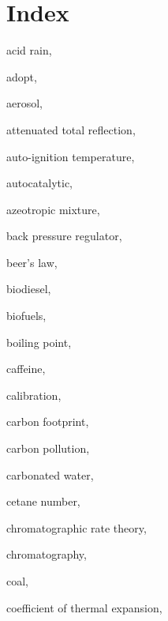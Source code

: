 
\chapter{Index} %

\label{AppendixA} %


\begin{theindex}

  \item \lowercase {acid rain}, 
  \item \lowercase {adopt}, 
  \item \lowercase {aerosol}, 
  \item \lowercase {attenuated total reflection}, 
  \item \lowercase {auto-ignition temperature}, 
  \item \lowercase {autocatalytic}, 
  \item \lowercase {azeotropic mixture}, 
  \item \lowercase {back pressure regulator}, 
  \item \lowercase {Beer's law}, 
  \item \lowercase {biodiesel}, 
  \item \lowercase {biofuels}, 
  \item \lowercase {boiling point}, 
  \item \lowercase {caffeine}, 
  \item \lowercase {calibration}, 
  \item \lowercase {carbon footprint}, 
  \item \lowercase {carbon pollution}, 
  \item \lowercase {carbonated water}, 
  \item \lowercase {cetane number}, 
  \item \lowercase {chromatographic rate theory}, 
  \item \lowercase {chromatography}, 
  \item \lowercase {coal}, 
  \item \lowercase {coefficient of thermal expansion}, 

\end{theindex}
